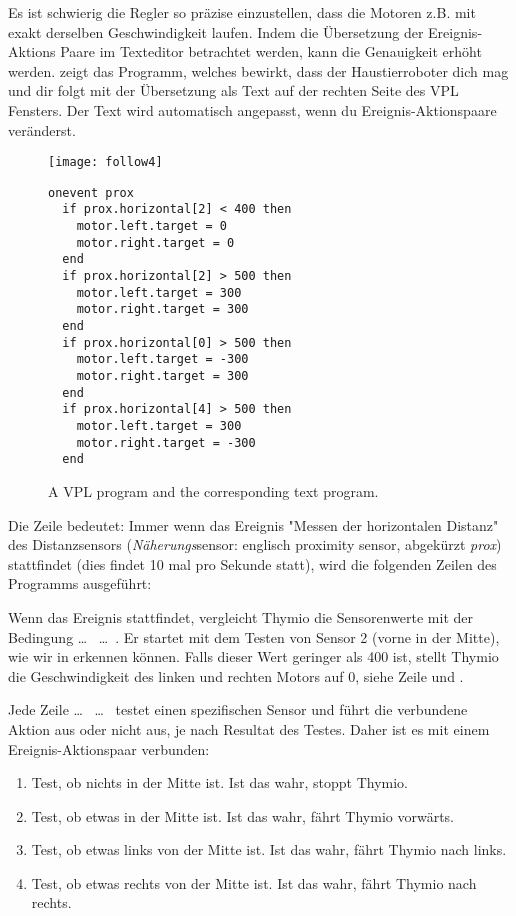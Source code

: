 Es ist schwierig die Regler so präzise einzustellen, dass die Motoren z.B. mit exakt derselben Geschwindigkeit laufen. Indem die Übersetzung der Ereignis-Aktions Paare im Texteditor betrachtet werden, kann die Genauigkeit erhöht werden.  zeigt das Programm, welches bewirkt, dass der Haustierroboter dich mag und dir folgt mit der Übersetzung als Text auf der rechten Seite des VPL Fensters.
Der Text wird automatisch angepasst, wenn du Ereignis-Aktionspaare veränderst.

\begin{figure}
\texttt{[image: follow4]}
\hfill
\begin{minipage}[b]{0.6\textwidth}
\footnotesize
\begin{lstlisting}
onevent prox
  if prox.horizontal[2] < 400 then
    motor.left.target = 0
    motor.right.target = 0
  end
  if prox.horizontal[2] > 500 then
    motor.left.target = 300
    motor.right.target = 300
  end
  if prox.horizontal[0] > 500 then
    motor.left.target = -300
    motor.right.target = 300
  end
  if prox.horizontal[4] > 500 then
    motor.left.target = 300
    motor.right.target = -300
  end
\end{lstlisting}
\end{minipage}
\caption{A VPL program and the corresponding text program.}
\label{fig.textcode}
\end{figure}

Die Zeile  bedeutet:
Immer wenn das Ereignis "Messen der horizontalen Distanz"  des Distanzsensors (\emph{Näherungs}sensor: englisch proximity sensor, abgekürzt \emph{prox}) 
stattfindet (dies findet 10 mal pro Sekunde statt), wird
die folgenden Zeilen des Programms ausgeführt:

Wenn das Ereignis stattfindet, vergleicht Thymio die Sensorenwerte mit der Bedingung
 \ldots \  \ldots \ .
Er startet mit dem Testen von Sensor 2 (vorne in der Mitte), wie wir in  erkennen können.
Falls dieser Wert geringer als 400 ist, stellt Thymio die Geschwindigkeit des linken und rechten Motors auf 0, siehe Zeile  und .

Jede Zeile
 \ldots \  \ldots \  
testet einen spezifischen Sensor und führt die verbundene Aktion aus oder nicht aus, je nach Resultat des Testes.
Daher ist es mit einem Ereignis-Aktionspaar verbunden:

\begin{enumerate}[start=0,noitemsep,nosep]
	\item Test, ob nichts in der Mitte ist. Ist das wahr, stoppt Thymio.
	\item Test, ob etwas in der Mitte ist. Ist das wahr, fährt Thymio vorwärts.
	\item Test, ob etwas links von der Mitte ist. Ist das wahr, fährt Thymio nach links.
	\item Test, ob etwas rechts von der Mitte ist. Ist das wahr, fährt Thymio nach rechts. 
\end{enumerate}

